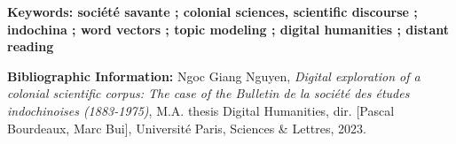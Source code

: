 \medskip

\textbf{Keywords:  société savante ; colonial sciences, scientific discourse ; indochina ; word vectors ; topic modeling ; digital humanities ; distant reading }

\textbf{Bibliographic Information:} Ngoc Giang Nguyen, \textit{Digital exploration of a colonial scientific corpus: The case of the Bulletin de la société des études indochinoises (1883-1975)}, M.A. thesis \og Digital Humanities\fg{}, dir. [Pascal Bourdeaux, Marc Bui], Université Paris, Sciences \& Lettres, 2023.


\clearpage